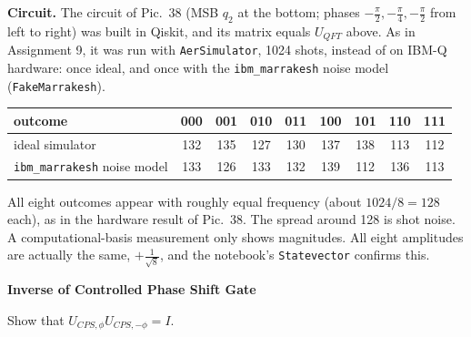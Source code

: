 \documentclass[a4paper, 10pt]{article}
\begin{document}
\begin{solution}
	\myspace

	\noindent \textbf{Circuit.} The circuit of Pic.~38 (MSB \( q_2 \) at the bottom; phases \( -\tfrac{\pi}{2}, -\tfrac{\pi}{4}, -\tfrac{\pi}{2} \) from left to right) was built in Qiskit, and its matrix equals \( U_{QFT} \) above.
	As in Assignment 9, it was run with \texttt{AerSimulator}, 1024 shots, instead of on IBM-Q hardware: once ideal, and once with the \texttt{ibm\_marrakesh} noise model (\texttt{FakeMarrakesh}).
	\begin{center}
		\begin{tabular}{lcccccccc}
			\toprule
			outcome                             & 000 & 001 & 010 & 011 & 100 & 101 & 110 & 111 \\
			\midrule
			ideal simulator                     & 132 & 135 & 127 & 130 & 137 & 138 & 113 & 112 \\
			\texttt{ibm\_marrakesh} noise model & 133 & 126 & 133 & 132 & 139 & 112 & 136 & 113 \\
			\bottomrule
		\end{tabular}
	\end{center}
	\noindent All eight outcomes appear with roughly equal frequency (about \( 1024/8 = 128 \) each), as in the hardware result of Pic.~38. The spread around 128 is shot noise.
	A computational-basis measurement only shows magnitudes. All eight amplitudes are actually the same, \( +\tfrac{1}{\sqrt{8}} \), and the notebook's \texttt{Statevector} confirms this.
\end{solution}

\begin{problem}
\textbf{Inverse of Controlled Phase Shift Gate}
\par Show that \( U_{CPS, \phi} U_{CPS, -\phi} = I \).
\end{problem}
\end{document}
